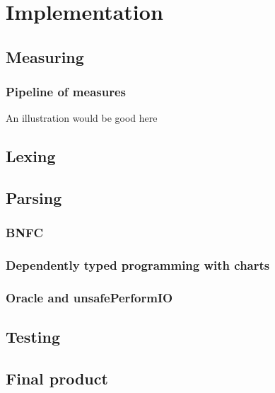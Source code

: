 \chapter{Implementation}

\section{Measuring}
\subsection{Pipeline of measures}
An illustration would be good here

\section{Lexing}

\section{Parsing}
\subsection{BNFC}
\subsection{Dependently typed programming with charts}
\subsection{Oracle and unsafePerformIO}

\section{Testing}

\section{Final product}

